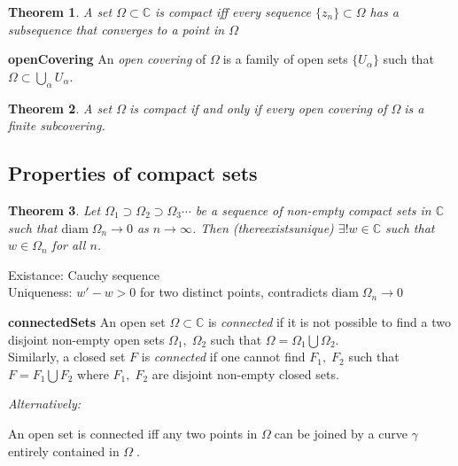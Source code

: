 \documentclass{article}
\newtheorem{theorem}{Theorem}[section]
\newenvironment{proof}[1][Proof]{\begin{trivlist}
\item[\hskip \labelsep {\bfseries #1}]}{\end{trivlist}}
\newenvironment{definition}[1][Definition]{\begin{trivlist}
\item[\hskip \labelsep {\bfseries #1}]}{\end{trivlist}}
\newcommand{\C}{\mathbb{C}}
\newcommand{\OO}{$ \Omega \;$}
\newcommand{\GG}{$ \gamma \;$}
\begin{document}
\begin{theorem}
    A set $\Omega \subset \C$ is compact iff every sequence \(\{z_n\} \subset \Omega\)
    has a subsequence that converges to a point in $\Omega$
\end{theorem}

\begin{definition} \label{openCovering} \textbf{openCovering}
    An \textit{open covering} of \OO is a family of open sets \(\{U_\alpha\}\) such that
    $\Omega \subset \bigcup_\alpha U_\alpha$.
\end{definition}

\begin{theorem}
    A set \OO is compact if and only if every open covering of \OO is a finite
    subcovering.
\end{theorem}

\subsection*{Properties of compact sets}

\begin{theorem}
    Let \(\Omega_1 \supset \Omega_2 \supset \Omega_3 \cdots\) be a sequence of non-empty compact sets in $\C$
    such that \(\text{diam}\;\Omega_n\rightarrow0\) as $n \rightarrow \infty$.
    Then (thereexistsunique) $\exists! w \in \C$ such that $w \in \Omega_n$ for all $n$.
\end{theorem}
\begin{proof}
    Existance: Cauchy sequence\\
    Uniqueness: $w' - w > 0$ for two distinct points, contradicts \(\text{diam}\;\Omega_n\rightarrow0\)
\end{proof}

\begin{definition} \label{connectedSets} \textbf{connectedSets}
    An open set $\Omega \subset \C$ is \textit{connected} if it is not possible to find
    a two disjoint non-empty open sets $\Omega_1,\; \Omega_2$ such that
    $\Omega = \Omega_1 \bigcup \Omega_2$.\\
    Similarly, a closed set $F$ is \textit{connected} if one cannot find $F_1, \; F_2$ such that
    $F = F_1 \bigcup F_2$ where $F_1, \;F_2$ are disjoint non-empty closed sets.
\end{definition}
\textit{Alternatively:}
\begin{definition}
    An open set is connected iff any two points in \OO can be joined by a curve \GG entirely contained in \OO.
\end{definition}
\end{document}
